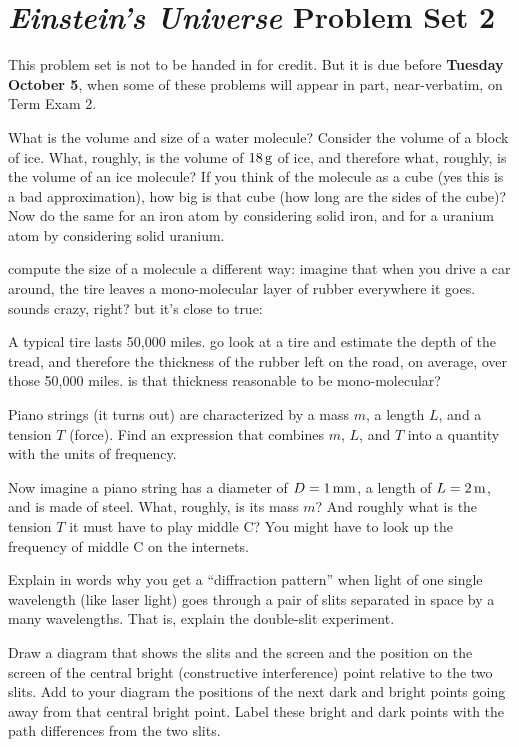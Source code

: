 \documentclass[12pt, letterpaper]{article}
\begin{document}
\section*{\textsl{Einstein's Universe} Problem Set 2}

This problem set is not to be handed in for credit. But it is due
before \textbf{Tuesday October 5}, when some of these problems
will appear in part, near-verbatim, on Term Exam 2.

\begin{problem}
What is the volume and size of a
water molecule?
Consider the volume of a block of ice. What,
roughly, is the volume of $18\,\mathrm{g}$ of ice, and therefore what,
roughly, is the volume of an ice molecule? If you think of the
molecule as a cube (yes this is a bad approximation), how big is that
cube (how long are the sides of the cube)? Now do the same for an iron
atom by considering solid iron, and for a uranium atom by considering
solid uranium.
\end{problem}

\begin{problem}
compute the size of a molecule a different way: imagine that when you
drive a car around, the tire leaves a mono-molecular layer of rubber
everywhere it goes. sounds crazy, right? but it's close to true:

A typical tire lasts 50,000 miles. go look at a tire and estimate the
depth of the tread, and therefore the thickness of the rubber left on
the road, on average, over those 50,000 miles. is that thickness
reasonable to be mono-molecular?
\end{problem}

\begin{problem}
Piano strings (it turns out) are characterized by a mass $m$, a length
$L$, and a tension $T$ (force). Find an expression that combines $m$,
$L$, and $T$ into a quantity with the units of frequency.

Now imagine a piano string has a diameter of $D=1\,\mathrm{mm}$, a length of
$L=2\,\mathrm{m}$, and is made of steel. What, roughly, is its mass $m$? And
roughly what is the tension $T$ it must have to play middle C? You
might have to look up the frequency of middle C on the internets.
\end{problem}

\begin{problem}
Explain in words why you get a ``diffraction pattern'' when light of
one single wavelength (like laser light) goes through a pair of slits
separated in space by a many wavelengths. That is, explain the
double-slit experiment.

Draw a diagram that shows the slits and the screen and the position on
the screen of the central bright (constructive interference) point
relative to the two slits. Add to your diagram the positions of the
next dark and bright points going away from that central bright
point. Label these bright and dark points with the path differences
from the two slits.
\end{problem}
\end{document}
